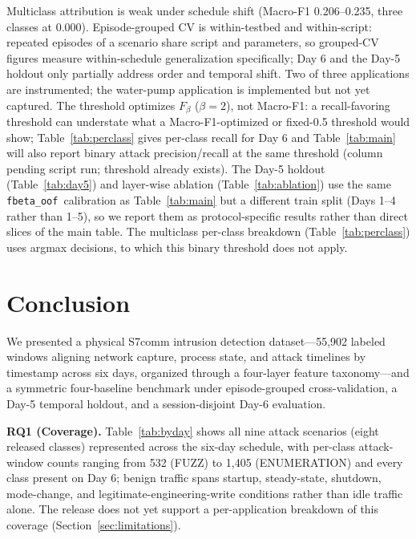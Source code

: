 \documentclass[conference]{IEEEtran}
\newcommand{\fbetaoof}{\texttt{fbeta\_oof}}
\begin{document}
Multiclass attribution is weak under schedule shift (Macro-F1 0.206--0.235, three classes at 0.000).
Episode-grouped CV is within-testbed and within-script: repeated episodes of a scenario share script and
parameters, so grouped-CV figures measure within-schedule generalization specifically; Day 6 and the
Day-5 holdout only partially address order and temporal shift. Two of three applications are instrumented;
the water-pump application is implemented but not yet captured. The threshold optimizes $F_\beta$
($\beta=2$), not Macro-F1: a recall-favoring threshold can understate what a Macro-F1-optimized or
fixed-0.5 threshold would show; Table~\ref{tab:perclass} gives per-class recall for Day 6 and
Table~\ref{tab:main} will also report binary attack precision/recall at the same threshold
(column pending script run; threshold already exists). The Day-5 holdout (Table~\ref{tab:day5}) and layer-wise ablation
(Table~\ref{tab:ablation}) use the same \fbetaoof\ calibration as Table~\ref{tab:main} but a different
train split (Days 1--4 rather than 1--5), so we report them as protocol-specific results rather than
direct slices of the main table. The multiclass per-class breakdown (Table~\ref{tab:perclass}) uses
argmax decisions, to which this binary threshold does not apply.

\section{Conclusion}

We presented a physical S7comm intrusion detection dataset---55{,}902 labeled windows aligning network
capture, process state, and attack timelines by timestamp across six days, organized through a
four-layer feature taxonomy---and a symmetric four-baseline benchmark under episode-grouped
cross-validation, a Day-5 temporal holdout, and a session-disjoint Day-6 evaluation.

\textbf{RQ1 (Coverage).} Table~\ref{tab:byday} shows all nine attack scenarios (eight released classes)
represented across the six-day schedule, with per-class attack-window counts ranging from 532 (FUZZ) to
1{,}405 (ENUMERATION) and every class present on Day 6; benign traffic spans startup, steady-state,
shutdown, mode-change, and legitimate-engineering-write conditions rather than idle traffic alone. The
release does not yet support a per-application breakdown of this coverage
(Section~\ref{sec:limitations}).
\end{document}
